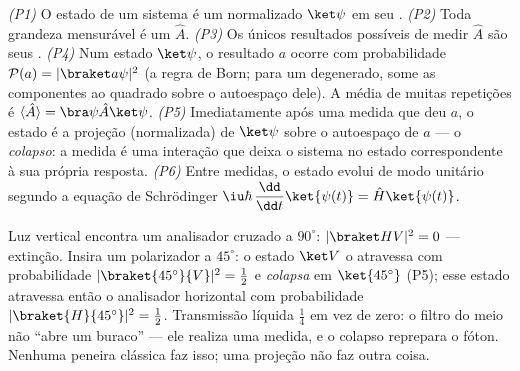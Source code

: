 \begin{theorem}\label{thm:b3:quantum-formalism:postulates}
\emph{(P1)} O estado de um sistema é um  normalizado $\ket\psi$ em
seu .
\emph{(P2)} Toda grandeza mensurável é um 
$\hat A$.
\emph{(P3)} Os únicos resultados possíveis de medir $\hat A$ são seus
.
\emph{(P4)} Num estado $\ket\psi$, o resultado $a$ ocorre com
probabilidade $\mathcal P(a) = |\braket a\psi|^2$ (a regra de Born;
para um  degenerado, some as componentes ao quadrado sobre o
autoespaço dele). A média de muitas repetições é $\langle\hat A\rangle =
\bra\psi\hat A\ket\psi$.
\emph{(P5)} Imediatamente após uma medida que deu $a$, o estado é a
projeção (normalizada) de $\ket\psi$ sobre o autoespaço de $a$ --- o
\emph{colapso}: a medida é uma interação que deixa o sistema no estado
correspondente à sua própria resposta.
\emph{(P6)} Entre medidas, o estado evolui de modo unitário segundo a
equação de Schrödinger
$\iu\hbar\,\dfrac{\dd}{\dd t}\ket{\psi(t)} = \hat H\ket{\psi(t)}$.
\end{theorem}
\admitted

\begin{example}\label{ex:b3:quantum-formalism:threepolarizers}
Luz vertical encontra um analisador cruzado a $90^\circ$: $|\braket
HV|^2 = 0$ --- extinção. Insira um polarizador a $45^\circ$: o estado
$\ket V$ o atravessa com probabilidade $|\braket{45^\circ}{V}|^2 =
\tfrac12$ e \emph{colapsa} em $\ket{45^\circ}$ (P5); esse estado
atravessa então o analisador horizontal com probabilidade
$|\braket{H}{45^\circ}|^2 = \tfrac12$. Transmissão líquida $\tfrac14$
em vez de zero: o filtro do meio não ``abre um buraco'' --- ele
realiza uma medida, e o colapso reprepara o fóton. Nenhuma peneira
clássica faz isso; uma projeção não faz outra coisa.
\end{example}

